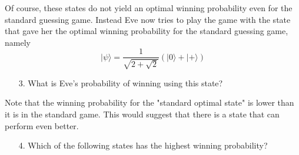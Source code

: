 \begin{exercises}
\begin{enumerate}
\end{enumerate}
Of course, these states do not yield an optimal winning probability even for the standard guessing game. Instead Eve now tries to play the game with the state that gave her the optimal winning probability for the standard guessing game, namely
 \[|\psi\rangle = \frac{1}{\sqrt{2+\sqrt{2}}}(|0\rangle + |+\rangle)\]
\begin{enumerate}
\item[3.] What is Eve's probability of winning using this state?
\end{enumerate}
Note that the winning probability for the "standard optimal state" is lower than it is in the standard game. This would suggest that there is a state that can perform even better.
\begin{enumerate}
\item[4.] Which of the following states has the highest winning probability?
\end{enumerate}
\end{exercises}
